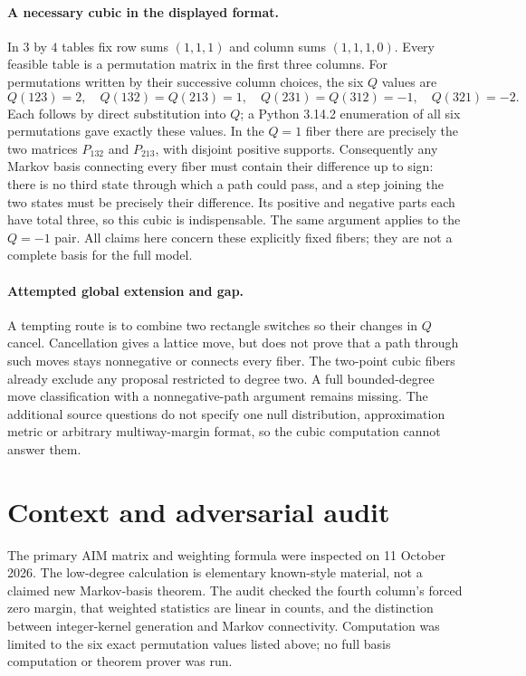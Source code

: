 \documentclass[11pt]{article}
\begin{document}
\paragraph{A necessary cubic in the displayed format.}
In $3$ by $4$ tables fix row sums $(1,1,1)$ and column sums $(1,1,1,0)$.
Every feasible table is a permutation matrix in the first three columns.
For permutations written by their successive column choices, the six
$Q$ values are
\[
Q(123)=2,\quad Q(132)=Q(213)=1,\quad
Q(231)=Q(312)=-1,\quad Q(321)=-2.
\]
Each follows by direct substitution into $Q$; a Python 3.14.2 enumeration
of all six permutations gave exactly these values. In the $Q=1$ fiber
there are precisely the two matrices $P_{132}$ and $P_{213}$, with
disjoint positive supports. Consequently any Markov basis connecting
every fiber must contain their difference up to sign: there is no third
state through which a path could pass, and a step joining the two states
must be precisely their difference. Its positive and negative parts each
have total three, so this cubic is indispensable. The same argument
applies to the $Q=-1$ pair. All claims here concern these explicitly fixed
fibers; they are not a complete basis for the full model.

\paragraph{Attempted global extension and gap.}
A tempting route is to combine two rectangle switches so their changes
in $Q$ cancel. Cancellation gives a lattice move, but does not prove
that a path through such moves stays nonnegative or connects every
fiber. The two-point cubic fibers already exclude any proposal restricted
to degree two. A full bounded-degree move classification with a
nonnegative-path argument remains missing. The additional source questions
do not specify one null distribution, approximation metric or arbitrary
multiway-margin format, so the cubic computation cannot answer them.

\section{Context and adversarial audit}
The primary AIM matrix and weighting formula were inspected on
11 October 2026. The low-degree calculation is elementary known-style
material, not a claimed new Markov-basis theorem. The audit checked the
fourth column's forced zero margin, that weighted statistics are linear
in counts, and the distinction between integer-kernel generation and
Markov connectivity. Computation was limited to the six exact permutation
values listed above; no full basis computation or theorem prover was run.
\end{document}
